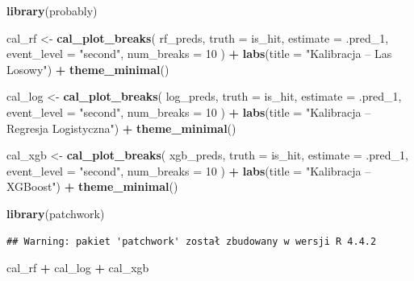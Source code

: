 \documentclass[
]{article}
\newenvironment{Shaded}{\begin{snugshade}}{\end{snugshade}}
\newcommand{\AttributeTok}[1]{\textcolor[rgb]{0.13,0.29,0.53}{#1}}
\newcommand{\DecValTok}[1]{\textcolor[rgb]{0.00,0.00,0.81}{#1}}
\newcommand{\FunctionTok}[1]{\textcolor[rgb]{0.13,0.29,0.53}{\textbf{#1}}}
\newcommand{\NormalTok}[1]{#1}
\newcommand{\OtherTok}[1]{\textcolor[rgb]{0.56,0.35,0.01}{#1}}
\newcommand{\SpecialCharTok}[1]{\textcolor[rgb]{0.81,0.36,0.00}{\textbf{#1}}}
\newcommand{\StringTok}[1]{\textcolor[rgb]{0.31,0.60,0.02}{#1}}
\begin{document}
\begin{Shaded}
\begin{Highlighting}[]
\FunctionTok{library}\NormalTok{(probably)}

\NormalTok{cal\_rf }\OtherTok{\textless{}{-}} \FunctionTok{cal\_plot\_breaks}\NormalTok{(}
\NormalTok{  rf\_preds, }\AttributeTok{truth =}\NormalTok{ is\_hit, }\AttributeTok{estimate =}\NormalTok{ .pred\_1,}
  \AttributeTok{event\_level =} \StringTok{"second"}\NormalTok{, }\AttributeTok{num\_breaks =} \DecValTok{10}
\NormalTok{) }\SpecialCharTok{+} \FunctionTok{labs}\NormalTok{(}\AttributeTok{title =} \StringTok{"Kalibracja – Las Losowy"}\NormalTok{) }\SpecialCharTok{+} \FunctionTok{theme\_minimal}\NormalTok{()}

\NormalTok{cal\_log }\OtherTok{\textless{}{-}} \FunctionTok{cal\_plot\_breaks}\NormalTok{(}
\NormalTok{  log\_preds, }\AttributeTok{truth =}\NormalTok{ is\_hit, }\AttributeTok{estimate =}\NormalTok{ .pred\_1,}
  \AttributeTok{event\_level =} \StringTok{"second"}\NormalTok{, }\AttributeTok{num\_breaks =} \DecValTok{10}
\NormalTok{) }\SpecialCharTok{+} \FunctionTok{labs}\NormalTok{(}\AttributeTok{title =} \StringTok{"Kalibracja – Regresja Logistyczna"}\NormalTok{) }\SpecialCharTok{+} \FunctionTok{theme\_minimal}\NormalTok{()}

\NormalTok{cal\_xgb }\OtherTok{\textless{}{-}} \FunctionTok{cal\_plot\_breaks}\NormalTok{(}
\NormalTok{  xgb\_preds, }\AttributeTok{truth =}\NormalTok{ is\_hit, }\AttributeTok{estimate =}\NormalTok{ .pred\_1,}
  \AttributeTok{event\_level =} \StringTok{"second"}\NormalTok{, }\AttributeTok{num\_breaks =} \DecValTok{10}
\NormalTok{) }\SpecialCharTok{+} \FunctionTok{labs}\NormalTok{(}\AttributeTok{title =} \StringTok{"Kalibracja – XGBoost"}\NormalTok{) }\SpecialCharTok{+} \FunctionTok{theme\_minimal}\NormalTok{()}

\FunctionTok{library}\NormalTok{(patchwork)}
\end{Highlighting}
\end{Shaded}

\begin{verbatim}
## Warning: pakiet 'patchwork' został zbudowany w wersji R 4.4.2
\end{verbatim}

\begin{Shaded}
\begin{Highlighting}[]
\NormalTok{cal\_rf }\SpecialCharTok{+}\NormalTok{ cal\_log }\SpecialCharTok{+}\NormalTok{ cal\_xgb}
\end{Highlighting}
\end{Shaded}
\end{document}
